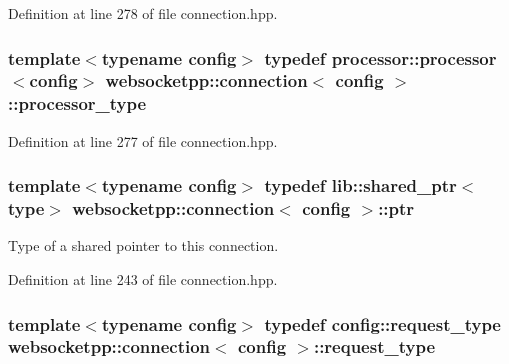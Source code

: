 Definition at line 278 of file connection.\+hpp.

\hypertarget{classwebsocketpp_1_1connection_a77cd1bb26e05961a5fbc60708244d1fe}{}
\subsubsection[{processor\+\_\+type}]{\setlength{\rightskip}{0pt plus 5cm}template$<$typename config$>$ typedef {\bf processor\+::processor}$<$config$>$ {\bf websocketpp\+::connection}$<$ config $>$\+::{\bf processor\+\_\+type}}\label{classwebsocketpp_1_1connection_a77cd1bb26e05961a5fbc60708244d1fe}


Definition at line 277 of file connection.\+hpp.

\hypertarget{classwebsocketpp_1_1connection_ab910d42e3bde91546183cc54642f32ab}{}
\subsubsection[{ptr}]{\setlength{\rightskip}{0pt plus 5cm}template$<$typename config$>$ typedef lib\+::shared\+\_\+ptr$<${\bf type}$>$ {\bf websocketpp\+::connection}$<$ config $>$\+::{\bf ptr}}\label{classwebsocketpp_1_1connection_ab910d42e3bde91546183cc54642f32ab}


Type of a shared pointer to this connection. 



Definition at line 243 of file connection.\+hpp.

\hypertarget{classwebsocketpp_1_1connection_ac4d9911b0954de83079ce6867a5cf57f}{}
\subsubsection[{request\+\_\+type}]{\setlength{\rightskip}{0pt plus 5cm}template$<$typename config$>$ typedef config\+::request\+\_\+type {\bf websocketpp\+::connection}$<$ config $>$\+::{\bf request\+\_\+type}}\label{classwebsocketpp_1_1connection_ac4d9911b0954de83079ce6867a5cf57f}



